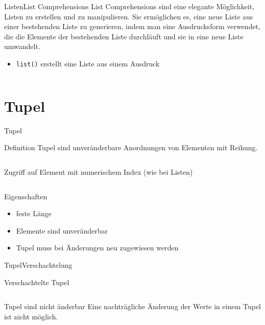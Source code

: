 \documentclass[xelatex,aspectratio=169]{beamer}
\begin{document}
\begin{frame}{Listen}{List Comprehensions}
    List Comprehensions sind eine elegante Möglichkeit, Listen zu erstellen und zu manipulieren. Sie ermöglichen es, eine neue Liste aus einer bestehenden Liste zu generieren, indem man eine Ausdrucksform verwendet, die die Elemente der bestehenden Liste durchläuft und sie in eine neue Liste umwandelt.

    \begin{itemize}
        \item \texttt{list()} erstellt eine Liste aus einem Ausdruck
    \end{itemize}


    \inputminted[lastline=8]{python}{src/listen_comprehensions.py}
\end{frame}

\section{Tupel}

\begin{frame}{Tupel}
    \begin{block}{Definition}
        Tupel sind unveränderbare Anordnungen von Elementen mit Reihung.
    \end{block}

    \inputminted[lastline=4]{python}{src/tupel_overview.py}

    Zugriff auf Element mit numerischem Index (wie bei Listen)

    \inputminted[firstline=6]{python}{src/tupel_overview.py}

    \begin{block}{Eigenschaften}
        \begin{itemize}
            \item feste Länge
            \item Elemente sind unveränderbar
            \item Tupel muss bei Änderungen neu zugewiesen werden
        \end{itemize}

    \end{block}

\end{frame}

\begin{frame}{Tupel}{Verschachtelung}
    \begin{block}{Verschachtelte Tupel}
        \small
        \inputminted[lastline=5]{python}{src/tupel_nested.py}
    \end{block}
    \vspace{-5pt}
    \begin{alertblock}{Tupel sind nicht änderbar}
        \small
        Eine nachträgliche Änderung der Werte in einem Tupel ist nicht möglich.
        \vspace{-5pt}
        \inputminted[firstline=7]{python}{src/tupel_nested.py}

    \end{alertblock}

\end{frame}
\end{document}
